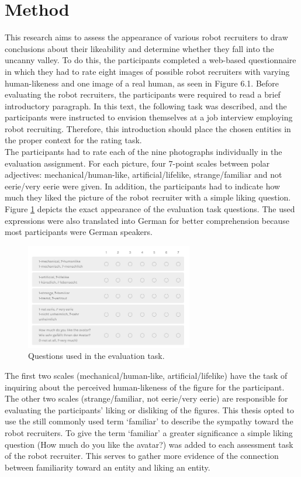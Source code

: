 \section{Method}
This research aims to assess the appearance of various robot recruiters to draw conclusions about their likeability and determine whether they fall into the uncanny valley. To do this, the participants completed a web-based questionnaire in which they had to rate eight images of possible robot recruiters with varying human-likeness and one image of a real human, as seen in Figure 6.1. Before evaluating the robot recruiters, the participants were required to read a brief introductory paragraph. In this text, the following task was described, and the participants were instructed to envision themselves at a job interview employing robot recruiting. Therefore, this introduction should place the chosen entities in the proper context for the rating task. \\
The participants had to rate each of the nine photographs individually in the evaluation assignment. For each picture, four 7-point scales between polar adjectives: mechanical/human-like, artificial/lifelike, strange/familiar and not eerie/very eerie were given. In addition, the participants had to indicate how much they liked the picture of the robot recruiter with a simple liking question. Figure \ref{fig:evaluation_task} depicts the exact appearance of the evaluation task questions. The used expressions were also translated into German for better comprehension because most participants were German speakers.
\begin{figure} %
    \centering
    \includegraphics[width=0.65\textwidth]{graphics/evaluation_task.png}
    \caption{Questions used in the evaluation task.}
    \label{fig:evaluation_task}
\end{figure}
The first two scales (mechanical/human-like, artificial/lifelike)  have the task of inquiring about the perceived human-likeness of the figure for the participant. The other two scales (strange/familiar, not eerie/very eerie) are responsible for evaluating the participants' liking or disliking of the figures. This thesis opted to use the still commonly used term `familiar' to describe the sympathy toward the robot recruiters. To give the term `familiar' a greater significance a simple liking question (How much do you like the avatar?) was added to each assessment task of the robot recruiter. This serves to gather more evidence of the connection between familiarity toward an entity and liking an entity.\\
